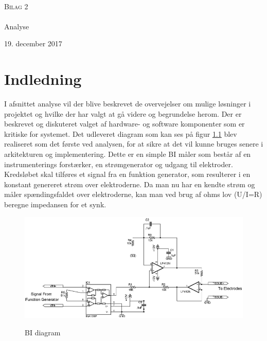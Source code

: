 \documentclass[main.tex]{subfiles}
\begin{document}
\begin{titlingpage}
\begin{center}

~ \\[3cm]


\textsc{\LARGE Bilag 2}\\[1.5cm]


\noindent\makebox[\linewidth]{\rule{\textwidth}{0.4pt}}\\
[0.5cm]{\Huge Analyse}
\noindent\makebox[\linewidth]{\rule{\textwidth}{0.4pt}}
\end{center}
\vfill
\begin{center}
{\large 19. december 2017}
\end{center}
\end{titlingpage}

\newpage
\tableofcontents*
\newpage

\chapter{Indledning}


I afsnittet analyse vil der blive beskrevet de overvejelser om mulige løsninger i projektet og hvilke der har valgt at gå videre og begrundelse herom. Der er beskrevet og diskuteret valget af hardware- og software komponenter som er kritiske for systemet. Det udleveret diagram som kan ses på figur \ref{BIdiagram} blev realiseret som det første ved analysen, for at sikre at det vil kunne bruges senere i arkitekturen og implementering. Dette er en simple BI måler som består af en instrumenterings forstærker, en strømgenerator og udgang til elektroder. Kredsløbet skal tilføres et signal fra en funktion generator, som resulterer i en konstant genereret strøm over elektroderne. Da man nu har en kendte strøm og måler spændingsfaldet over elektroderne, kan man ved brug af ohms lov (U/I=R) beregne impedansen for et synk.


\begin{figure}[H]
\centering
{\includegraphics[width=\linewidth]
{Figure/BIdiagram}}
\caption{BI diagram\cite{Aroom2009}}
\label{BIdiagram}
\end{figure}
\end{document}
